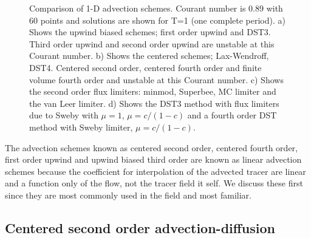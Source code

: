 \begin{figure}
\caption{
Comparison of 1-D advection schemes. Courant number is 0.89 with 60
points and solutions are shown for T=1 (one complete period).
a) Shows the upwind biased schemes; first order upwind and DST3.
Third order upwind and second order upwind are unstable at this Courant number.
b) Shows the centered schemes; Lax-Wendroff, DST4. Centered second order,
centered fourth order and finite volume fourth order and unstable at this
Courant number.
c) Shows the second order flux limiters: minmod, Superbee,
MC limiter and the van Leer limiter.
d) Shows the DST3 method with flux limiters due to Sweby with
$\mu=1$, $\mu=c/(1-c)$ and a fourth order DST method with Sweby limiter,
$\mu=c/(1-c)$.
\label{fig:advect-1d-hi}
}
\end{figure}

The advection schemes known as centered second order, centered fourth
order, first order upwind and upwind biased third order are known as
linear advection schemes because the coefficient for interpolation of
the advected tracer are linear and a function only of the flow, not
the tracer field it self. We discuss these first since they are most
commonly used in the field and most familiar.

\subsection{Centered second order advection-diffusion}

